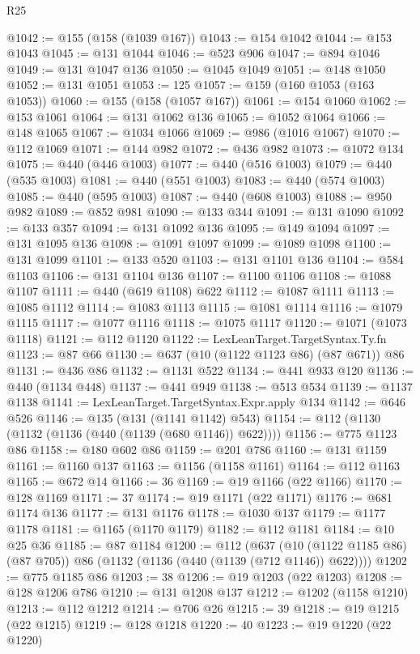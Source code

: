 \begin{lexlean}{R25}
\begin{coremodule}
@1042 := @155 (@158 (@1039 @167))
@1043 := @154 @1042
@1044 := @153 @1043
@1045 := @131 @1044
@1046 := @523 @906
@1047 := @894 @1046
@1049 := @131 @1047 @136
@1050 := @1045 @1049
@1051 := @148 @1050
@1052 := @131 @1051
@1053 := 125
@1057 := @159 (@160 @1053 (@163 @1053))
@1060 := @155 (@158 (@1057 @167))
@1061 := @154 @1060
@1062 := @153 @1061
@1064 := @131 @1062 @136
@1065 := @1052 @1064
@1066 := @148 @1065
@1067 := @1034 @1066
@1069 := @986 (@1016 @1067)
@1070 := @112 @1069
@1071 := @144 @982
@1072 := @436 @982
@1073 := @1072 @134
@1075 := @440 (@446 @1003)
@1077 := @440 (@516 @1003)
@1079 := @440 (@535 @1003)
@1081 := @440 (@551 @1003)
@1083 := @440 (@574 @1003)
@1085 := @440 (@595 @1003)
@1087 := @440 (@608 @1003)
@1088 := @950 @982
@1089 := @852 @981
@1090 := @133 @344
@1091 := @131 @1090
@1092 := @133 @357
@1094 := @131 @1092 @136
@1095 := @149 @1094
@1097 := @131 @1095 @136
@1098 := @1091 @1097
@1099 := @1089 @1098
@1100 := @131 @1099
@1101 := @133 @520
@1103 := @131 @1101 @136
@1104 := @584 @1103
@1106 := @131 @1104 @136
@1107 := @1100 @1106
@1108 := @1088 @1107
@1111 := @440 (@619 @1108) @622
@1112 := @1087 @1111
@1113 := @1085 @1112
@1114 := @1083 @1113
@1115 := @1081 @1114
@1116 := @1079 @1115
@1117 := @1077 @1116
@1118 := @1075 @1117
@1120 := @1071 (@1073 @1118)
@1121 := @112 @1120
@1122 := LexLeanTarget.TargetSyntax.Ty.fn
@1123 := @87 @66
@1130 := @637 (@10 (@1122 @1123 @86) (@87 @671)) @86
@1131 := @436 @86
@1132 := @1131 @522
@1134 := @441 @933 @120
@1136 := @440 (@1134 @448)
@1137 := @441 @949
@1138 := @513 @534
@1139 := @1137 @1138
@1141 := LexLeanTarget.TargetSyntax.Expr.apply @134
@1142 := @646 @526
@1146 := @135 (@131 (@1141 @1142) @543)
@1154 := @112 (@1130 (@1132 (@1136 (@440 (@1139 (@680 @1146)) @622))))
@1156 := @775 @1123 @86
@1158 := @180 @602 @86
@1159 := @201 @786
@1160 := @131 @1159
@1161 := @1160 @137
@1163 := @1156 (@1158 @1161)
@1164 := @112 @1163
@1165 := @672 @14
@1166 := 36
@1169 := @19 @1166 (@22 @1166)
@1170 := @128 @1169
@1171 := 37
@1174 := @19 @1171 (@22 @1171)
@1176 := @681 @1174 @136
@1177 := @131 @1176
@1178 := @1030 @137
@1179 := @1177 @1178
@1181 := @1165 (@1170 @1179)
@1182 := @112 @1181
@1184 := @10 @25 @36
@1185 := @87 @1184
@1200 := @112
    (@637 (@10 (@1122 @1185 @86) (@87 @705)) @86 (@1132 (@1136 (@440 (@1139 (@712 @1146)) @622))))
@1202 := @775 @1185 @86
@1203 := 38
@1206 := @19 @1203 (@22 @1203)
@1208 := @128 @1206 @786
@1210 := @131 @1208 @137
@1212 := @1202 (@1158 @1210)
@1213 := @112 @1212
@1214 := @706 @26
@1215 := 39
@1218 := @19 @1215 (@22 @1215)
@1219 := @128 @1218
@1220 := 40
@1223 := @19 @1220 (@22 @1220)

\end{coremodule}
\end{lexlean}
